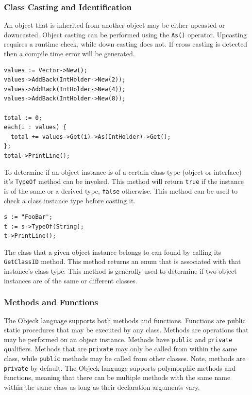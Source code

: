 \documentclass[11pt]{article}
\begin{document}
\subsubsection{Class Casting and Identification}
An object that is inherited from another object may be either upcasted
or downcasted.  Object casting can be performed using the
\texttt{As()} operator.  Upcasting requires a runtime check, while
down casting does not. If cross casting is detected then a compile
time error will be generated.

\begin{verbatim}
values := Vector->New();
values->AddBack(IntHolder->New(2));
values->AddBack(IntHolder->New(4));
values->AddBack(IntHolder->New(8));

total := 0;
each(i : values) {
  total += values->Get(i)->As(IntHolder)->Get();
};
total->PrintLine();
\end{verbatim}

To determine if an object instance is of a certain class type (object
or interface) it's \texttt{TypeOf} method can be invoked.  This method
will return \texttt{true} if the instance is of the same or a derived
type, \texttt{false} otherwise.  This method can be used to check a
class instance type before casting it.

\begin{verbatim}
s := "FooBar";
t := s->TypeOf(String);
t->PrintLine();
\end{verbatim}

The class that a given object instance belongs to can found by calling
its \texttt{GetClassID} method.  This method returns an enum that is
associated with that instance's class type.  This method is generally
used to determine if two object instances are of the same or different
classes.

\subsubsection{Methods and Functions}
The Objeck language supports both methods and functions.  Functions
are public static procedures that may be executed by any class.
Methods are operations that may be performed on an object instance.
Methods have \texttt{public} and \texttt{private} qualifiers.  Methods
that are \texttt{private} may only be called from within the same
class, while \texttt{public} methods may be called from other classes.
Note, methods are \texttt{private} by default. The Objeck language
supports polymorphic methods and functions, meaning that there can be
multiple methods with the same name within the same class as long as
their declaration arguments vary.
\end{document}
